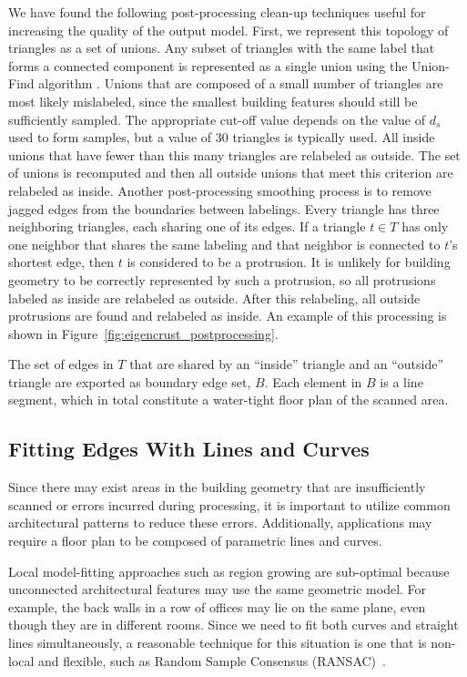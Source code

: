 \documentclass[12pt,onecolumn,oneside]{book}
\begin{document}
We have found the following post-processing clean-up techniques useful for increasing the quality of the output model.  First, we represent this topology of triangles as a set of unions.  Any subset of triangles with the same label that forms a connected component is represented as a single union using the Union-Find algorithm \cite{Unionfind}.  Unions that are composed of a small number of triangles are most likely mislabeled, since the smallest building features should still be sufficiently sampled.  The appropriate cut-off value depends on the value of $d_s$ used to form samples, but a value of 30 triangles is typically used.  All inside unions that have fewer than this many triangles are relabeled as outside. The set of unions is recomputed and then all outside unions that meet this criterion are relabeled as inside. Another post-processing smoothing process is to remove jagged edges from the boundaries between labelings.  Every triangle has three neighboring triangles, each sharing one of its edges.  If a triangle $t \in T$ has only one neighbor that shares the same labeling and that neighbor is connected to $t$'s shortest edge, then $t$ is considered to be a protrusion.  It is unlikely for building geometry to be correctly represented by such a protrusion, so all protrusions labeled as inside are relabeled as outside. After this relabeling, all outside protrusions are found and relabeled as inside.  An example of this processing is shown in Figure~\ref{fig:eigencrust_postprocessing}.

The set of edges in $T$ that are shared by an ``inside'' triangle and an ``outside'' triangle are exported as boundary edge set, $B$.  Each element in $B$ is a line segment, which in total constitute a water-tight floor plan of the scanned area.

\subsection{Fitting Edges With Lines and Curves}
\label{ssec:eigencrust_fitting}

Since there may exist areas in the building geometry that are insufficiently scanned or errors incurred during processing, it is important to utilize common architectural patterns to reduce these errors.  Additionally, applications may require a floor plan to be composed of parametric lines and curves.

Local model-fitting approaches such as region growing are sub-optimal because unconnected architectural features may use the same geometric model.  For example, the back walls in a row of offices may lie on the same plane, even though they are in different rooms. Since we need to fit both curves and straight lines simultaneously, a reasonable technique for this situation is one that is non-local and flexible, such as Random Sample Consensus (RANSAC)~\cite{Ransac}.
\end{document}
